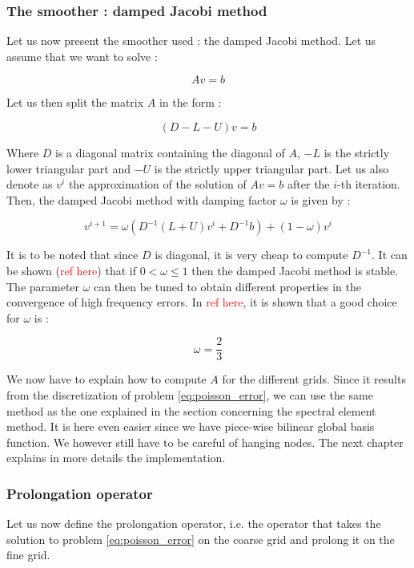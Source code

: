 \subsubsection{The smoother : damped Jacobi method}

Let us now present the smoother used : the damped Jacobi method. Let us assume that we want to solve :

$$Av=b$$

Let us then split the matrix $A$ in the form : 

$$(D-L-U)v = b$$

Where $D$ is a diagonal matrix containing the diagonal of $A$, $-L$ is the strictly lower triangular part and $-U$ is the strictly upper triangular part. Let us also denote as $v^i$ the approximation of the solution of $Av=b$ after the $i$-th iteration. Then, the damped Jacobi method with damping factor $\omega$ is given by : 

$$ v^{i+1} = \omega\left(D^{-1}(L+U)v^i + D^{-1}b\right) + (1-\omega)v^i$$

It is to be noted that since $D$ is diagonal, it is very cheap to compute $D^{-1}$. It can be shown (\textcolor{red}{ref here}) that if $0<\omega\leq 1$ then the damped Jacobi method is stable. The parameter $\omega$ can then be tuned to obtain different properties in the convergence of high frequency errors. In \textcolor{red}{ref here}, it is shown that a good choice for $\omega$ is : 

$$\omega = \frac{2}{3}$$

We now have to explain how to compute $A$ for the different grids. Since it results from the discretization of problem \ref{eq:poisson_error}, we can use the same method as the one explained in the section concerning the spectral element method. It is here even easier since we have piece-wise bilinear global basis function. We however still have to be careful of hanging nodes. The next chapter explains in more details the implementation. 

\subsubsection{Prolongation operator}

Let us now define the prolongation operator, i.e. the operator that takes the solution to problem \ref{eq:poisson_error} on the coarse grid and prolong it on the fine grid. 

